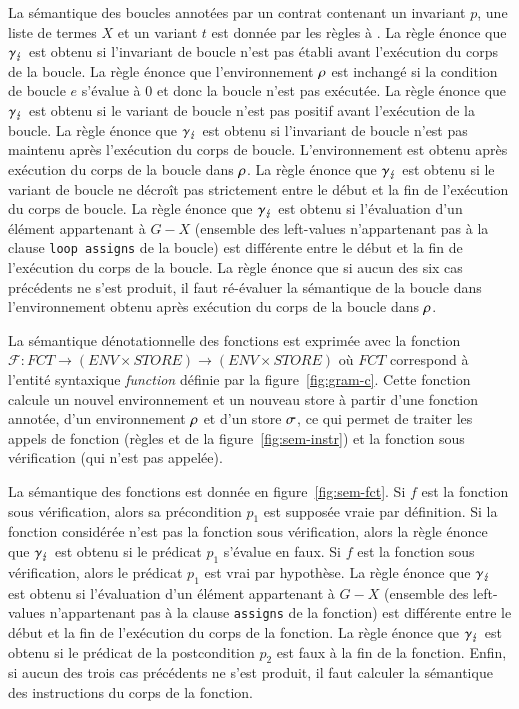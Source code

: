 La sémantique des boucles annotées par un contrat contenant un invariant
$p$, une liste de termes $X$ et un variant $t$ est
donnée par les règles  à .
La règle  énonce que $\gamma_\lightning$ est obtenu si l'invariant de
boucle n'est pas établi avant l'exécution du corps de la boucle.
La règle  énonce que l'environnement $\rho$ est inchangé si
la condition de boucle $e$ s'évalue à $0$ et donc la boucle n'est pas
exécutée.
La règle  énonce que $\gamma_\lightning$ est obtenu si le variant de
boucle n'est pas positif avant l'exécution de la boucle.
La règle  énonce que $\gamma_\lightning$ est obtenu si l'invariant de
boucle n'est pas maintenu après l'exécution du corps de boucle.
L'environnement  est obtenu après exécution du
corps de la boucle dans $\rho$.
La règle  énonce que $\gamma_\lightning$ est obtenu si le variant de
boucle ne décroît pas strictement entre le début et la fin de l'exécution du
corps de boucle.
La règle  énonce que $\gamma_\lightning$ est obtenu si l'évaluation
d'un élément appartenant à $G-X$ (ensemble des left-values n'appartenant pas à
la clause \lstinline'loop assigns' de la boucle) est différente entre le début
et la fin de l'exécution du corps de la boucle.
La règle  énonce que si aucun des six cas précédents ne s'est
produit, il faut ré-évaluer la sémantique de la boucle dans l'environnement
obtenu après exécution du corps de la boucle dans $\rho$.





La sémantique dénotationnelle des fonctions est exprimée avec la fonction
$\mathcal{F} : FCT \rightarrow (ENV \times STORE) \rightarrow (ENV \times STORE)$ où $FCT$ correspond à
l'entité syntaxique \textit{function} définie par la figure~\ref{fig:gram-c}.
Cette fonction calcule un nouvel environnement et un nouveau store à partir
d'une fonction annotée, d'un environnement $\rho$ et d'un store $\sigma$, ce qui
permet de traiter les appels de fonction (règles  et
 de la figure~\ref{fig:sem-instr}) et la fonction sous
vérification (qui n'est pas appelée).

La sémantique des fonctions est donnée en figure~\ref{fig:sem-fct}.
Si $f$ est la fonction sous vérification, alors sa
précondition $p_1$ est supposée vraie par définition.
Si la fonction considérée n'est pas la fonction sous vérification, alors la
règle  énonce que $\gamma_\lightning$ est obtenu si le prédicat
$p_1$ s'évalue en faux.
Si $f$ est la fonction sous vérification, alors le prédicat
$p_1$ est vrai par hypothèse.
La règle  énonce que $\gamma_\lightning$ est obtenu si l'évaluation
d'un élément appartenant à $G-X$ (ensemble des left-values n'appartenant pas à
la clause \lstinline'assigns' de la fonction) est différente entre le début
et la fin de l'exécution du corps de la fonction.
La règle  énonce que $\gamma_\lightning$ est obtenu si le prédicat de la
postcondition $p_2$ est faux à la fin de la fonction.
Enfin, si aucun des trois cas précédents ne s'est produit, il faut calculer la
sémantique des instructions du corps de la fonction.


